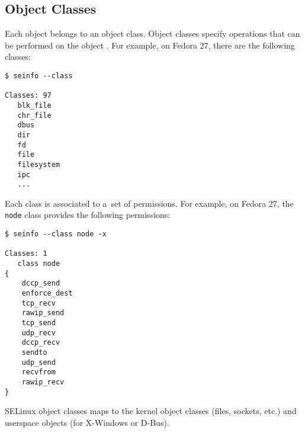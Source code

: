 \subsection{Object Classes}
Each object belongs to an object class. Object classes specify operations that
can be performed on the object \cite[pp.~29--30]{tsn}. For example, on Fedora
27, there are the following classes:
\begin{lstlisting}
$ seinfo --class

Classes: 97
   blk_file
   chr_file
   dbus
   dir
   fd
   file
   filesystem
   ipc
   ...
\end{lstlisting}

Each class is associated to a~set of permissions. For example, on Fedora 27,
the \texttt{node} class provides the following permissions:
\begin{lstlisting}
$ seinfo --class node -x

Classes: 1
   class node
{
	dccp_send
	enforce_dest
	tcp_recv
	rawip_send
	tcp_send
	udp_recv
	dccp_recv
	sendto
	udp_send
	recvfrom
	rawip_recv
}
\end{lstlisting}
SELinux object classes maps to the kernel object classes (files, sockets, etc.)
and userspace objects (for X-Windows or D-Bus).

